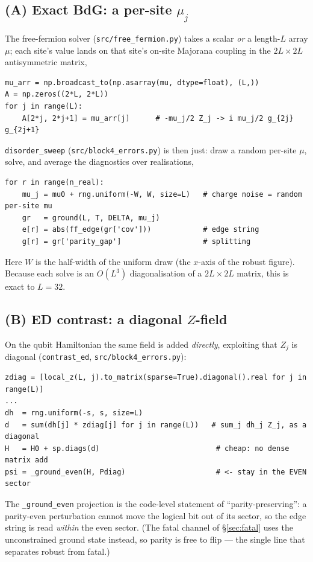 \documentclass[11pt]{article}
\newcommand{\code}[1]{\texttt{#1}}
\begin{document}
\subsection{(A) Exact BdG: a per-site $\mu_j$}
The free-fermion solver (\code{src/free\_fermion.py}) takes a scalar \emph{or} a
length-$L$ array $\mu$; each site's value lands on that site's on-site Majorana
coupling in the $2L\times2L$ antisymmetric matrix,
\begin{lstlisting}
mu_arr = np.broadcast_to(np.asarray(mu, dtype=float), (L,))
A = np.zeros((2*L, 2*L))
for j in range(L):
    A[2*j, 2*j+1] = mu_arr[j]      # -mu_j/2 Z_j -> i mu_j/2 g_{2j} g_{2j+1}
\end{lstlisting}
\code{disorder\_sweep} (\code{src/block4\_errors.py}) is then just: draw a random
per-site $\mu$, solve, and average the diagnostics over realisations,
\begin{lstlisting}
for r in range(n_real):
    mu_j = mu0 + rng.uniform(-W, W, size=L)   # charge noise = random per-site mu
    gr   = ground(L, T, DELTA, mu_j)
    e[r] = abs(ff_edge(gr['cov']))            # edge string
    g[r] = gr['parity_gap']                   # splitting
\end{lstlisting}
Here $W$ is the half-width of the uniform draw (the $x$-axis of the robust figure).
Because each solve is an $O(L^3)$ diagonalisation of a $2L\times2L$ matrix, this is
exact to $L=32$.

\subsection{(B) ED contrast: a diagonal $Z$-field}
On the qubit Hamiltonian the same field is added \emph{directly}, exploiting that
$Z_j$ is diagonal (\code{contrast\_ed}, \code{src/block4\_errors.py}):
\begin{lstlisting}
zdiag = [local_z(L, j).to_matrix(sparse=True).diagonal().real for j in range(L)]
...
dh  = rng.uniform(-s, s, size=L)
d   = sum(dh[j] * zdiag[j] for j in range(L))   # sum_j dh_j Z_j, as a diagonal
H   = H0 + sp.diags(d)                           # cheap: no dense matrix add
psi = _ground_even(H, Pdiag)                     # <- stay in the EVEN sector
\end{lstlisting}
The \code{\_ground\_even} projection is the code-level statement of
``parity-preserving'': a parity-even perturbation cannot move the logical bit out
of its sector, so the edge string is read \emph{within} the even sector. (The fatal
channel of \S\ref{sec:fatal} uses the unconstrained ground state instead, so parity
is free to flip --- the single line that separates robust from fatal.)
\end{document}
